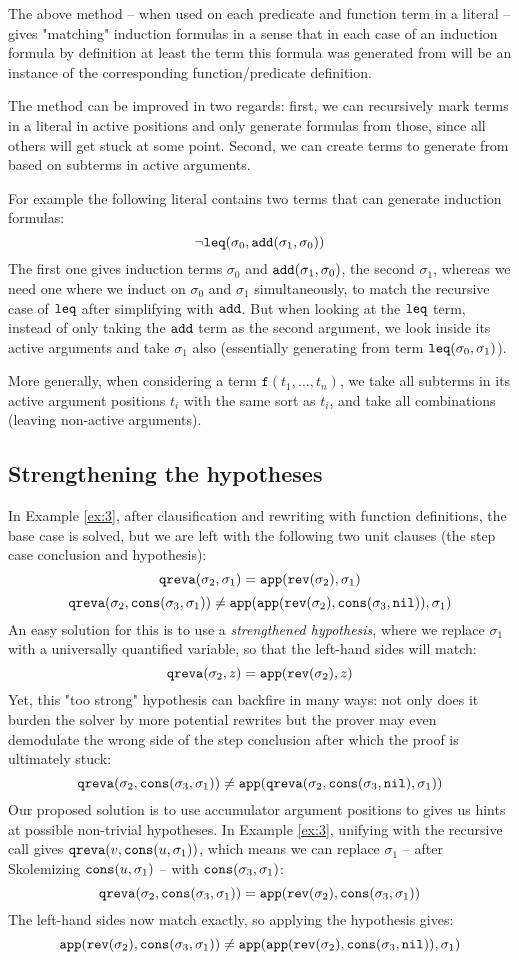 The above method -- when used on each predicate and function term in a literal -- gives "matching" induction formulas in a sense that in each case of an induction formula by definition at least the term this formula was generated from will be an instance of the corresponding function/predicate definition.

The method can be improved in two regards: first, we can recursively mark terms in a literal in active positions and only generate formulas from those, since all others will get stuck at some point. Second, we can create terms to generate from based on subterms in active arguments.

For example the following literal contains two terms that can generate induction formulas:
$$\neg\mathtt{leq}(\sigma_0,\mathtt{add}(\sigma_1,\sigma_0))$$
The first one gives induction terms $\sigma_0$ and $\mathtt{add}(\sigma_1,\sigma_0)$, the second $\sigma_1$, whereas we need one where we induct on $\sigma_0$ and $\sigma_1$ simultaneously, to match the recursive case of $\mathtt{leq}$ after simplifying with $\mathtt{add}$. But when looking at the $\mathtt{leq}$ term, instead of only taking the $\mathtt{add}$ term as the second argument, we look inside its active arguments and take $\sigma_1$ also (essentially generating from term $\mathtt{leq}(\sigma_0, \sigma_1)$).

More generally, when considering a term $\mathtt{f}(t_1,...,t_n)$, we take all subterms in its active argument positions $t_i$ with the same sort as $t_i$, and take all combinations (leaving non-active arguments).
\subsection{Strengthening the hypotheses}
In Example \ref{ex:3}, after clausification and rewriting with function definitions, the base case is solved, but we are left with the following two unit clauses (the step case conclusion and hypothesis):
$$\mathtt{qreva}(\sigma_2,\sigma_1)=\mathtt{app}(\mathtt{rev}(\sigma_2),\sigma_1)$$
$$\mathtt{qreva}(\sigma_2,\mathtt{cons}(\sigma_3,\sigma_1))\neq\mathtt{app}(\mathtt{app}(\mathtt{rev}(\sigma_2),\mathtt{cons}(\sigma_3,\mathtt{nil})),\sigma_1)$$
An easy solution for this is to use a \textit{strengthened hypothesis}, where we replace $\sigma_1$ with a universally quantified variable, so that the left-hand sides will match:
$$\mathtt{qreva}(\sigma_2,z)=\mathtt{app}(\mathtt{rev}(\sigma_2),z)$$
Yet, this "too strong" hypothesis can backfire in many ways: not only does it burden the solver by more potential rewrites but the prover may even demodulate the wrong side of the step conclusion after which the proof is ultimately stuck:
$$\mathtt{qreva}(\sigma_2,\mathtt{cons}(\sigma_3,\sigma_1))\neq\mathtt{app}(\mathtt{qreva}(\sigma_2,\mathtt{cons}(\sigma_3,\mathtt{nil}),\sigma_1))$$
Our proposed solution is to use accumulator argument positions to gives us hints at possible non-trivial hypotheses. In Example \ref{ex:3}, unifying with the recursive call gives $\mathtt{qreva}(v, \mathtt{cons}(u,\sigma_1))$, which means we can replace $\sigma_1$ -- after Skolemizing $\mathtt{cons}(u,\sigma_1)$ -- with $\mathtt{cons}(\sigma_3,\sigma_1)$:
$$\mathtt{qreva}(\sigma_2,\mathtt{cons}(\sigma_3,\sigma_1))=\mathtt{app}(\mathtt{rev}(\sigma_2),\mathtt{cons}(\sigma_3,\sigma_1))$$
The left-hand sides now match exactly, so applying the hypothesis gives:
$$\mathtt{app}(\mathtt{rev}(\sigma_2),\mathtt{cons}(\sigma_3,\sigma_1))\neq\mathtt{app}(\mathtt{app}(\mathtt{rev}(\sigma_2),\mathtt{cons}(\sigma_3,\mathtt{nil})),\sigma_1)$$

